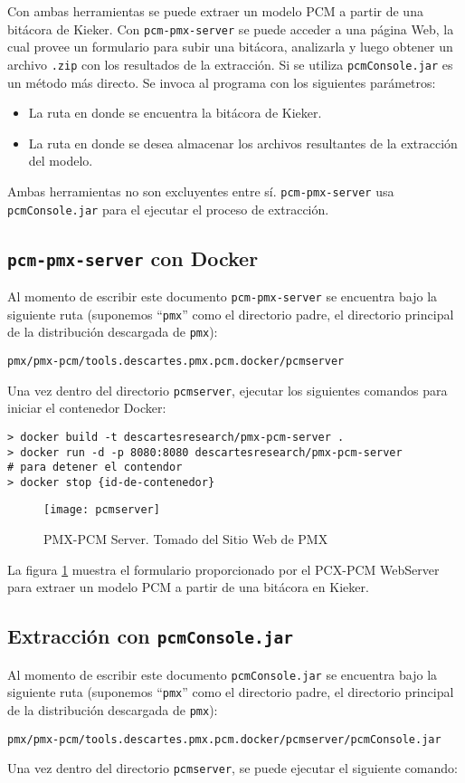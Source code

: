 Con ambas herramientas se puede extraer un modelo PCM a partir de una bitácora de Kieker. Con \texttt{pcm-pmx-server} se puede acceder a una página Web, la cual provee un formulario para subir una bitácora, analizarla y luego obtener un archivo \texttt{.zip} con los resultados de la extracción. Si se utiliza \texttt{pcmConsole.jar} es un método más directo. Se invoca al programa con los siguientes parámetros:
\begin{itemize}
    \item La ruta en donde se encuentra la bitácora de Kieker.
    \item La ruta en donde se desea almacenar los archivos resultantes de la extracción del modelo.
\end{itemize}
Ambas herramientas no son excluyentes entre sí.  \texttt{pcm-pmx-server} usa \texttt{pcmConsole.jar} para el ejecutar el proceso de extracción.

\subsection{\texttt{pcm-pmx-server} con Docker} 
Al momento de escribir este documento \texttt{pcm-pmx-server} se encuentra bajo la siguiente ruta (suponemos ``\texttt{pmx}'' como el directorio padre, el directorio principal de la distribución descargada de \texttt{pmx}):
\begin{verbatim}
pmx/pmx-pcm/tools.descartes.pmx.pcm.docker/pcmserver
\end{verbatim}
Una vez dentro del directorio \texttt{pcmserver}, ejecutar los siguientes comandos para iniciar el contenedor Docker:

\begin{verbatim}
> docker build -t descartesresearch/pmx-pcm-server .
> docker run -d -p 8080:8080 descartesresearch/pmx-pcm-server
# para detener el contendor
> docker stop {id-de-contenedor}
\end{verbatim}

\begin{figure}[h]
  \centering
  \texttt{[image: pcmserver]}
  \caption{PMX-PCM Server. Tomado del Sitio Web de PMX}
  \label{fig:pcmserver}
\end{figure}

La figura \ref{fig:pcmserver} muestra el formulario proporcionado por el PCX-PCM WebServer para extraer un modelo PCM a partir de una bitácora en Kieker.

\subsection{Extracción con \texttt{pcmConsole.jar}} Al momento de escribir este documento \texttt{pcmConsole.jar} se encuentra bajo la siguiente ruta (suponemos ``\texttt{pmx}'' como el directorio padre, el directorio principal de la distribución descargada de \texttt{pmx}):
\begin{verbatim}
pmx/pmx-pcm/tools.descartes.pmx.pcm.docker/pcmserver/pcmConsole.jar
\end{verbatim}
Una vez dentro del directorio \texttt{pcmserver}, se puede ejecutar el siguiente comando:

